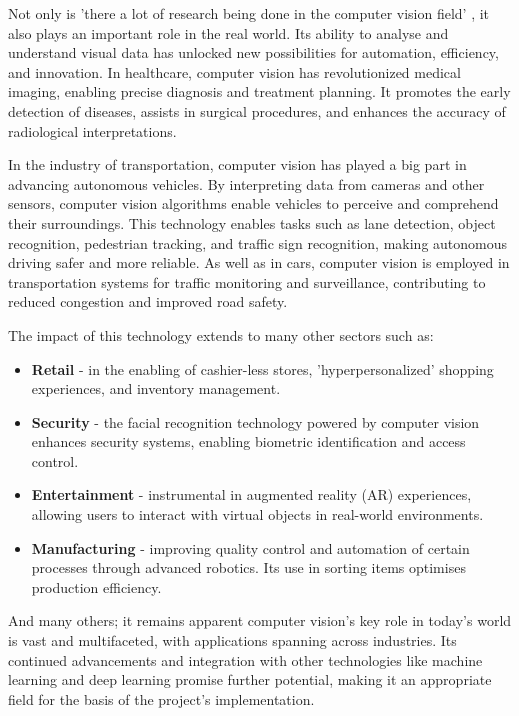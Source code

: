 \documentclass[final]{cmpreport_02}
\begin{document}
Not only is 'there a lot of research being done in the computer vision field' \citep{IBM:CV}, it also plays an important role in the real world. Its ability to analyse and understand visual data has unlocked new possibilities for automation, efficiency, and innovation.\nocite{Intel:CV} In healthcare, computer vision has revolutionized medical imaging, enabling precise diagnosis and treatment planning. It promotes the early detection of diseases, assists in surgical procedures, and enhances the accuracy of radiological interpretations. \citep{Intel:CV:Medical}

In the industry of transportation, computer vision has played a big part in advancing autonomous vehicles. By interpreting data from cameras and other sensors, computer vision algorithms enable vehicles to perceive and comprehend their surroundings. This technology enables tasks such as lane detection, object recognition, pedestrian tracking, and traffic sign recognition, making autonomous driving safer and more reliable. As well as in cars, computer vision is employed in transportation systems for traffic monitoring and surveillance, contributing to reduced congestion and improved road safety. \citep{Intel:CV:Transport}

The impact of this technology extends to many other sectors such as:
\begin{itemize}
	\item \textbf{Retail} - in the enabling of cashier-less stores, 'hyperpersonalized' \citep{Intel:CV:Retail} shopping experiences, and inventory management. 
	\item \textbf{Security} - the facial recognition technology powered by computer vision enhances security systems, enabling biometric identification and access control.
	\item \textbf{Entertainment} - instrumental in augmented reality (AR) experiences, allowing users to interact with virtual objects in real-world environments.
	\item \textbf{Manufacturing} - improving quality control and automation of certain processes through advanced robotics. Its use in sorting items optimises production efficiency. \citep{Intel:CV:Manufacturing}
\end{itemize}
And many others; it remains apparent computer vision's key role in today's world is vast and multifaceted, with applications spanning across industries. Its continued advancements and integration with other technologies like machine learning and deep learning promise further potential, making it an appropriate field for the basis of the project's implementation.
\end{document}
